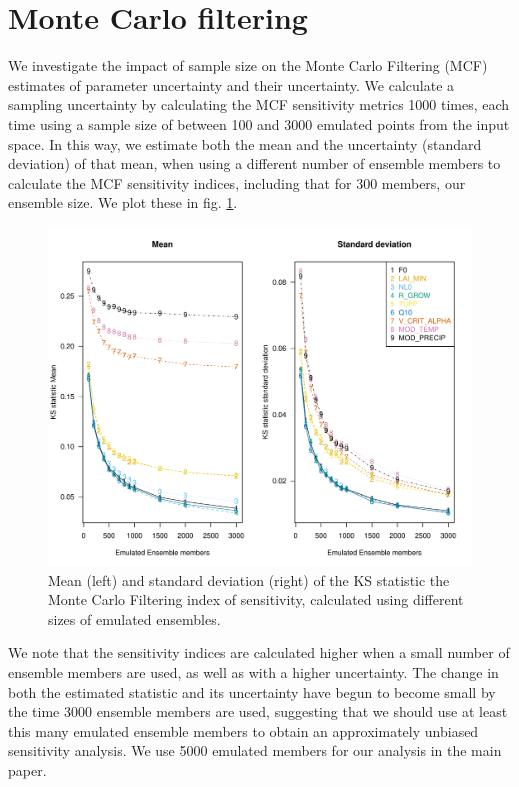 \documentclass[gmd, manuscript]{copernicus} %
\begin{document}
\section{Monte Carlo filtering}

We investigate the impact of sample size on the Monte Carlo Filtering (MCF) estimates of parameter uncertainty and their uncertainty. We calculate a sampling uncertainty by calculating the MCF sensitivity metrics 1000 times, each time using a sample size of between 100 and 3000 emulated points from the input space. In this way, we estimate both the mean and the uncertainty (standard deviation) of that mean, when using a different number of ensemble members to calculate the MCF sensitivity indices, including that for 300 members, our ensemble size. We plot these in fig. \ref{fig:mcf_mean_sd_vs_n}.

\begin{figure}[t]
\includegraphics[width=12cm]{../graphics/mcf_mean_sd_vs_n.pdf}
\caption{ Mean (left) and standard deviation (right) of the KS statistic the Monte Carlo Filtering index of sensitivity, calculated using different sizes of emulated ensembles.}
\label{fig:mcf_mean_sd_vs_n}
\end{figure}

We note that the sensitivity indices are calculated higher when a small number of ensemble members are used, as well as with a higher uncertainty. The change in both the estimated statistic and its uncertainty have begun to become small by the time 3000 ensemble members are used, suggesting that we should use at least this many emulated ensemble members to obtain an approximately unbiased sensitivity analysis. We use 5000 emulated members for our analysis in the main paper.
\end{document}
